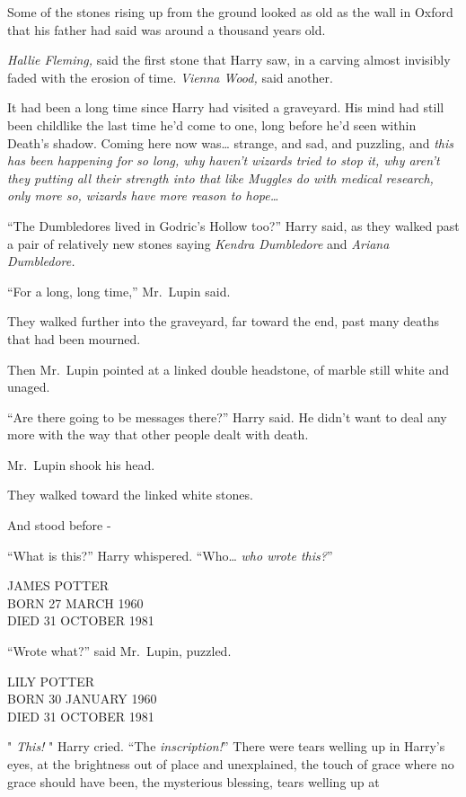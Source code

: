 Some of the stones rising up from the ground looked as old as the wall
in Oxford that his father had said was around a thousand years old.

\emph{Hallie Fleming,} said the first stone that Harry saw, in a carving
almost invisibly faded with the erosion of time. \emph{Vienna Wood,}
said another.

It had been a long time since Harry had visited a graveyard. His mind
had still been childlike the last time he'd come to one, long before
he'd seen within Death's shadow. Coming here now was\ldots{} strange,
and sad, and puzzling, and \emph{this has been happening for so long,
why haven't wizards tried to stop it, why aren't they putting all their
strength into that like Muggles do with medical research, only more so,
wizards have more reason to hope\ldots{}}

``The Dumbledores lived in Godric's Hollow too?'' Harry said, as they
walked past a pair of relatively new stones saying \emph{Kendra
Dumbledore} and \emph{Ariana Dumbledore.}

``For a long, long time,'' Mr.~Lupin said.

They walked further into the graveyard, far toward the end, past many
deaths that had been mourned.

Then Mr.~Lupin pointed at a linked double headstone, of marble still
white and unaged.

``Are there going to be messages there?'' Harry said. He didn't want to
deal any more with the way that other people dealt with death.

Mr.~Lupin shook his head.

They walked toward the linked white stones.

And stood before -

``What is this?'' Harry whispered. ``Who\ldots{} \emph{who wrote
this?}''

JAMES POTTER\\ BORN 27 MARCH 1960\\ DIED 31 OCTOBER 1981

``Wrote what?'' said Mr.~Lupin, puzzled.

LILY POTTER\\ BORN 30 JANUARY 1960\\ DIED 31 OCTOBER 1981

" \emph{This!} " Harry cried. ``The \emph{inscription!}'' There were
tears welling up in Harry's eyes, at the brightness out of place and
unexplained, the touch of grace where no grace should have been, the
mysterious blessing, tears welling up at

